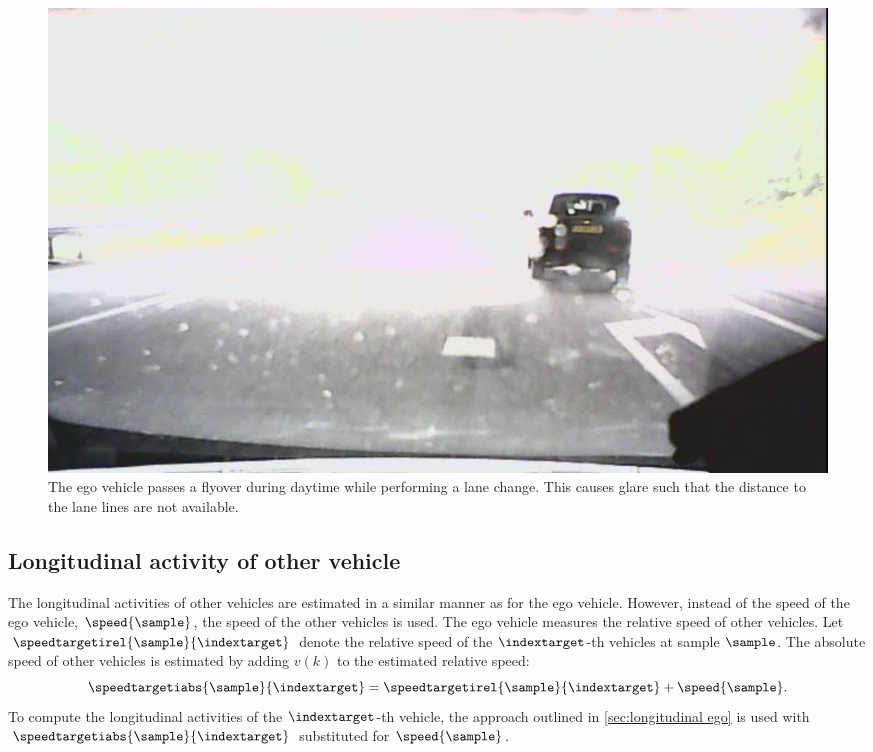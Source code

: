 \begin{figure}
	\centering
	\includegraphics[width=\linewidth]{figures/glare}
	\caption{\cstarta The ego vehicle passes a flyover during daytime while performing a lane change. This causes glare such that the distance to the lane lines are not available. 
	\cenda}
	\label{fig:glare}
\end{figure}



\subsection{Longitudinal activity of other vehicle}
\label{sec:longitudinal other vehicles}

The longitudinal activities of other vehicles are estimated in a similar manner as for the ego vehicle. However, instead of the speed of the ego vehicle, $\speed{\sample}$, the speed of the other vehicles is used. The ego vehicle measures the relative speed of other vehicles. Let $\speedtargetirel{\sample}{\indextarget}$ denote the relative speed of the $\indextarget$-th vehicles at sample $\sample$. The absolute speed of other vehicles is estimated by adding $v(k)$ to the estimated relative speed:
\begin{equation}
	\speedtargetiabs{\sample}{\indextarget} = \speedtargetirel{\sample}{\indextarget} + \speed{\sample}.
\end{equation}
To compute the longitudinal activities of the $\indextarget$-th vehicle, the approach outlined in \cref{sec:longitudinal ego} is used with $\speedtargetiabs{\sample}{\indextarget}$ substituted for $\speed{\sample}$. 

